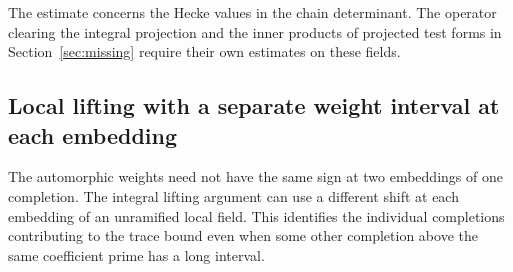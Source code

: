\documentclass[a4paper,11pt]{article}
\theoremstyle{definition}
\theoremstyle{remark}
\numberwithin{equation}{section}
\begin{document}
The estimate concerns the Hecke values in the chain determinant.
The operator clearing the integral projection and the inner products
of projected test forms in Section~\ref{sec:missing} require their
own estimates on these fields.
\clearpage

\subsection{Local lifting with a separate weight interval at each embedding}
\label{sec:labelledlift735}

The automorphic weights need not have the same sign at two
embeddings of one completion. The integral lifting argument can
use a different shift at each embedding of an unramified local
field. This identifies the individual completions contributing to
the trace bound even when some other completion above the same
coefficient prime has a long interval.
\end{document}
